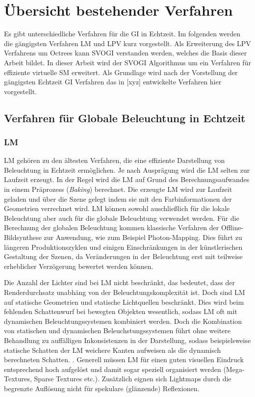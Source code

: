 \chapter{Übersicht bestehender Verfahren}

Es gibt unterschiedliche Verfahren für die \ac{GI} in Echtzeit. Im folgenden werden die gängigsten Verfahren \ac{LM} und \ac{LPV} kurz vorgestellt. Als Erweiterung des \ac{LPV} Verfahrens um Octrees kann \ac{SVOGI} verstanden werden, welches die Basis dieser Arbeit bildet. In dieser Arbeit wird der SVOGI Algorithmus um ein Verfahren für effiziente virtuelle \acf{SM} erweitert. Als Grundlage wird nach der Vorstellung der gängigsten Echtzeit \ac{GI} Verfahren das in [xyz] entwickelte Verfahren hier vorgestellt.

\blindtext

\section{Verfahren für Globale Beleuchtung in Echtzeit}

\subsection{\ac{LM}}
\acf{LM} gehören zu den ältesten Verfahren, die eine effiziente Darstellung von Beleuchtung in Echtzeit ermöglichen. Je nach Ausprägung wird die \ac{LM} selten zur Laufzeit erzeugt. In der Regel wird die \ac{LM} auf Grund des Berechnungsaufwandes in einem Präprozess (\textit{Baking}) berechnet. Die erzeugte \ac{LM} wird zur Laufzeit geladen und über die Szene gelegt indem sie mit den Farbinformationen der Geometrien verrechnet wird. \ac{LM} können sowohl auschließlich für die lokale Beleuchtung aber auch für die globale Beleuchtung verwendet werden. Für die Berechnung der globalen Beleuchtung kommen klassische Verfahren der Offline-Bildsynthese zur Anwendung, wie zum Beispiel Photon-Mapping.  Dies führt zu längeren Produktionszyklen  und einigen Einschränkungen in der künstlerischen Gestaltung der Szenen, da Veränderungen in der Beleuchtung erst mit teilweise erheblicher Verzögerung bewertet werden können. 

Die Anzahl der Lichter sind bei \ac{LM} nicht beschränkt, das bedeutet, dass der Renderdurchsatz  unabhäng von der Beleuchtungskomplexität ist. Doch sind \ac{LM} auf statische Geometrien und statische Lichtquellen beschränkt. Dies wird beim fehlenden Schattenwurf bei bewegten Objekten wesentlich, sodass \ac{LM} oft mit dynamischen Beleuchtungssystemen kombiniert werden. Doch die Kombination von statischen und dynamischen Beleuchstungssystemen führt ohne weitere Behandlung zu auffälligen Inkonsistenzen in der Darstellung, sodass beispielsweise statische Schatten der \ac{LM} weichere Kanten aufweisen als die dynamisch berechneten Schatten. \cite{cryenginesdk:lighting}. Generell müssen \ac{LM} für einen guten visuellen Eindruck entsprechend hoch aufgelöst und damit sogar speziell organisiert werden (Mega-Textures, Sparse Textures etc.). Zusätzlich eignen sich Lightmaps durch die begrenzte Auflösung nicht für spekulare (glänzende) Reflexionen.


